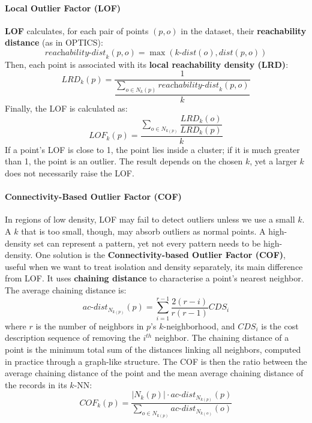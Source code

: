 \paragraph{Local Outlier Factor (LOF)}
\textbf{LOF} calculates, for each pair of points $(p,o)$ in the dataset, their \textbf{reachability distance} (as in OPTICS):
\begin{equation}
    \textit{reachability-dist}_k(p,o) = \max \left( \textit{k-dist}(o), \textit{dist}(p,o) \right)
\end{equation}
Then, each point is associated with its \textbf{local reachability density (LRD)}:
\begin{equation}
    \textit{LRD}_k(p) = \frac{1}{\dfrac{\sum_{o \in \textit{N}_k(p)} \textit{reachability-dist}_k(p,o)}{k}}
\end{equation}
Finally, the LOF is calculated as:
\begin{equation}
    \textit{LOF}_k(p) = \dfrac{\sum_{o \in N_{k(p)}} \dfrac{\textit{LRD}_k(o)}{\textit{LRD}_k(p)}}{k}
\end{equation}
If a point's LOF is close to 1, the point lies inside a cluster; if it is much greater than 1, the point is an outlier. The result depends on the chosen $k$, yet a larger $k$ does not necessarily raise the LOF.


\paragraph{Connectivity-Based Outlier Factor (COF)}
In regions of low density, LOF may fail to detect outliers unless we use a small $k$. A $k$ that is too small, though, may absorb outliers as normal points. A high-density set can represent a pattern, yet not every pattern needs to be high-density. One solution is the \textbf{Connectivity-based Outlier Factor (COF)}, useful when we want to treat isolation and density separately, its main difference from LOF. It uses \textbf{chaining distance} to characterise a point's nearest neighbor. The average chaining distance is:
\begin{equation}
    \textit{ac-dist}_{N_{k(p)}}(p) = \sum_{i=1}^{r-1} \dfrac{2(r-i)}{r(r-1)} \textit{CDS}_i
\end{equation}
where $r$ is the number of neighbors in $p$'s $k$-neighborhood, and $\textit{CDS}_i$ is the cost description sequence of removing the $i^{th}$ neighbor. The chaining distance of a point is the minimum total sum of the distances linking all neighbors, computed in practice through a graph-like structure. The COF is then the ratio between the average chaining distance of the point and the mean average chaining distance of the records in its $k$-NN:
\begin{equation}
    \textit{COF}_k(p) = \dfrac{|N_k(p)| \cdot \textit{ac-dist}_{N_{k(p)}}(p)}{\sum_{o \in N_{k(p)}} \textit{ac-dist}_{N_{k(o)}}(o)}
\end{equation}


